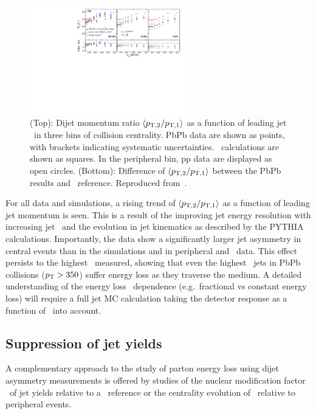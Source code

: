 \begin{figure}[!th]
\begin{center}
\includegraphics[width=0.6\textwidth]{jetfigures/deltaPtOverPt5_lead120_sub30_diff_20120103.pdf}
\caption{(Top): Dijet momentum ratio $\langle p_{\rm{T},2}/p_{\rm{T},1} \rangle$ as a function of
leading jet \pT\ in three bins of collision centrality.
PbPb data are shown as points, with brackets indicating systematic uncertainties.  
\PYTHYD\ calculations are shown as squares. In the peripheral bin,
pp data are displayed as open circles.
(Bottom): Difference of $\langle p_{\rm{T},2}/p_{\rm{T},1} \rangle$ between the PbPb results and \PYTHYD\ reference.
Reproduced from~\cite{CMS_dijet}.}
\label{fig:GR:CMS_pt_ratio}
\end{center}
\end{figure}

For all data and simulations, a rising trend of $\langle p_{\rm{T},2}/p_{\rm{T},1} \rangle$ as a function
of leading jet momentum is seen. This is a result of the improving jet energy resolution
with increasing jet \pT\ and the evolution in jet kinematics as described by the PYTHIA
calculations. Importantly, the data show a significantly larger jet asymmetry in central events
than in the simulations and in peripheral and \pp\ data. This effect persists to the
highest \pT\ measured, showing that even the highest \pT\ jets in PbPb collisions ($\mbox{$p_{\mathrm{T}}$} > 350$\GeVc)
suffer energy loss as they traverse the medium. A detailed understanding of the energy loss
\pT\ dependence (e.g.\ fractional vs constant energy loss) will require a full jet MC calculation
taking the detector response as a function of \pT\ into account.

\subsection{Suppression of jet yields}

A complementary approach to the study of parton energy loss using dijet asymmetry measurements
is offered by studies of the nuclear modification factor \Raa\ of jet yields relative
to a \pp\ reference or the centrality evolution of \Rcp\ relative to peripheral events.

